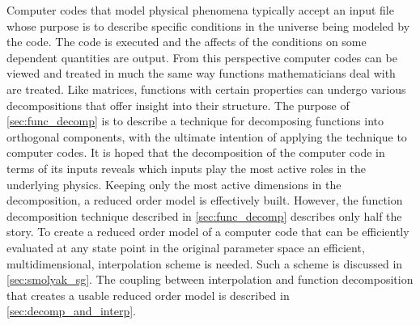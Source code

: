 
Computer codes that model physical phenomena typically accept an input file whose purpose is to describe specific conditions in the universe being modeled by the code. The code is executed and the affects of the conditions on some dependent quantities are output. From this perspective computer codes can be viewed and treated in much the same way functions mathematicians deal with are treated. Like matrices, functions with certain properties can undergo various decompositions that offer insight into their structure. The purpose of \ref{sec:func_decomp} is to describe a technique for decomposing functions into orthogonal components, with the ultimate intention of applying the technique to computer codes. It is hoped that the decomposition of the computer code in terms of its inputs reveals which inputs play the most active roles in the underlying physics. Keeping only the most active dimensions in the decomposition, a reduced order model is effectively built. However, the function decomposition technique described in \ref{sec:func_decomp} describes only half the story. To create a reduced order model of a computer code that can be efficiently evaluated at any state point in the original parameter space an efficient, multidimensional, interpolation scheme is needed. Such a scheme is discussed in \ref{sec:smolyak_sg}. The coupling between interpolation and function decomposition that creates a usable reduced order model is described in \ref{sec:decomp_and_interp}.    




